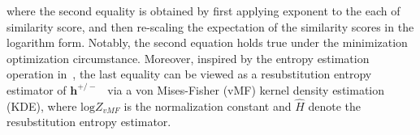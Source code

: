 \noindent 
where the second equality is obtained by first applying exponent to the each of similarity score, and then re-scaling the expectation of the similarity scores in the logarithm form. Notably, the second equation holds true under the minimization optimization circumstance. Moreover, inspired by the entropy estimation operation in~\cite{wang2020understanding}, the last equality can be viewed as a resubstitution entropy estimator of $\boldsymbol{h^{+/-}}$~\cite{ahmad1976nonparametric} via a von Mises-Fisher (vMF) kernel density estimation (KDE), where $\text{log}Z_{vMF}$ is the normalization constant and $\hat{H}$ denote the resubstitution entropy estimator.


